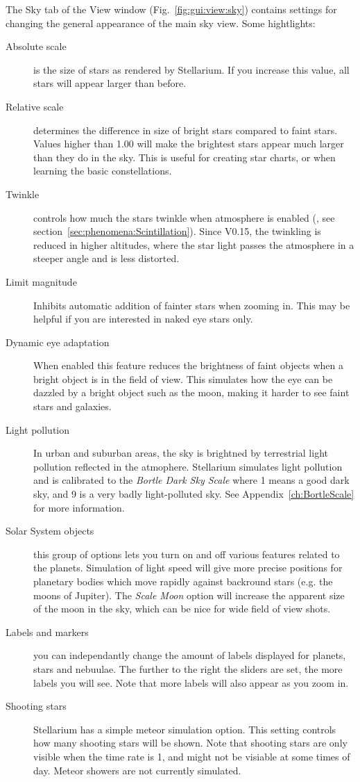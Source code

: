 The Sky tab of the View window (Fig.~\ref{fig:gui:view:sky}) contains settings
for changing the general appearance of the main sky view. Some
hightlights:

\begin{description}
\item[Absolute scale] is the size of stars as rendered by
  Stellarium. If you increase this value, all stars will appear larger
  than before.
\item[Relative scale] determines the difference in size of bright
  stars compared to faint stars. Values higher than 1.00 will make the
  brightest stars appear much larger than they do in the sky. This is
  useful for creating star charts, or when learning the basic
  constellations.
\item[Twinkle] controls how much the stars twinkle when atmosphere is
  enabled (, see section~\ref{sec:phenomena:Scintillation}). 
  Since V0.15, the twinkling is reduced in higher altitudes,
  where the star light passes the atmosphere in a steeper angle and is
  less distorted.
\item[Limit magnitude] Inhibits automatic addition of fainter stars
  when zooming in. This may be helpful if you are interested in naked
  eye stars only.
\item[Dynamic eye adaptation] When enabled this feature reduces the
  brightness of faint objects when a bright object is in the field of
  view. This simulates how the eye can be dazzled by a bright object
  such as the moon, making it harder to see faint stars and galaxies.
\item[Light pollution] In urban and suburban areas, the sky is
  brightned by terrestrial light pollution reflected in the atmophere.
  Stellarium simulates light pollution and is calibrated to the
  \emph{Bortle Dark Sky Scale} where 1 means a good dark sky, and 9 is
  a very badly light-polluted sky. See Appendix~\ref{ch:BortleScale}
  for more information.
\item[Solar System objects] this group of options lets you turn on
  and off various features related to the planets. Simulation of light
  speed will give more precise positions for planetary bodies which move
  rapidly against backround stars (e.g. the moons of Jupiter). The
  \emph{Scale Moon} option will increase the apparent size of the moon
  in the sky, which can be nice for wide field of view shots.
\item[Labels and markers] you can independantly change the amount of
  labels displayed for planets, stars and nebuulae. The further to the
  right the sliders are set, the more labels you will see. Note that
  more labels will also appear as you zoom in.
\item[Shooting stars] Stellarium has a simple meteor simulation
  option. This setting controls how many shooting stars will be shown.
  Note that shooting stars are only visible when the time rate is 1, and
  might not be visiable at some times of day. Meteor showers are not
  currently simulated.
\end{description}

